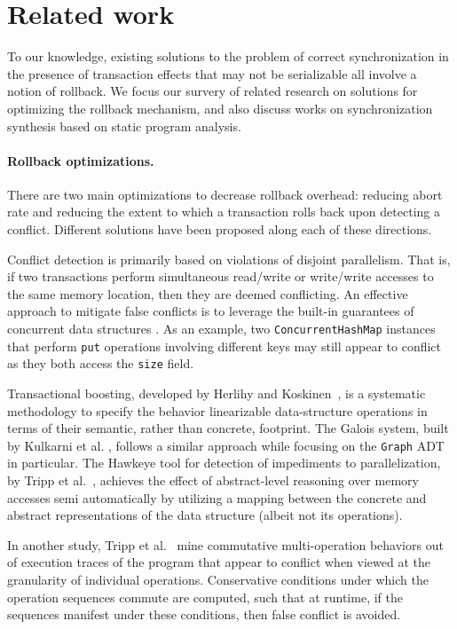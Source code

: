 \section{Related work}

To our knowledge, existing solutions to the problem of correct synchronization in the presence of transaction effects that may not be serializable all involve a notion of rollback. We focus our survery of related research on solutions for optimizing the rollback mechanism, and also discuss works on synchronization synthesis based on static program analysis.

\paragraph{Rollback optimizations.} There are two main optimizations to decrease rollback overhead: reducing abort rate and reducing the extent to which a transaction rolls back upon detecting a conflict. Different solutions have been proposed along each of these directions.

Conflict detection is primarily based on violations of disjoint parallelism. That is, if two transactions perform simultaneous read/write or write/write accesses to the same memory location, then they are deemed conflicting. 
%
An effective approach to mitigate false conflicts is to leverage the built-in guarantees of concurrent data structures \cite{XXX,Galois,TYFS:OOPSLA11}. As an example, two {\tt ConcurrentHashMap} instances that perform {\tt put} operations involving different keys may still appear to conflict as they both access the {\tt size} field.

Transactional boosting, developed by Herlihy and Koskinen~\cite{XXX}, is a systematic methodology to specify the behavior linearizable data-structure operations in terms of their semantic, rather than concrete, footprint. The Galois system, built by Kulkarni et al. \cite{Galois}, follows a similar approach while focusing on the {\tt Graph} ADT in particular. The Hawkeye tool for detection of impediments to parallelization, by Tripp et al.~\cite{TYFS:OOPSLA11}, achieves the effect of abstract-level reasoning over memory accesses semi automatically by utilizing a mapping between the concrete and abstract representations of the data structure (albeit not its operations).  

In another study, Tripp et al.~\cite{TMFS:PLDI12} mine commutative multi-operation behaviors out of execution traces of the program that appear to conflict when viewed at the granularity of individual operations. Conservative conditions under which the operation sequences commute are computed, such that at runtime, if the sequences manifest under these conditions, then false conflict is avoided.

